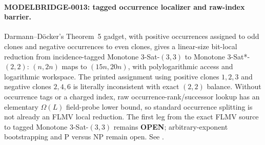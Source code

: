 \paragraph{MODELBRIDGE-0013: tagged occurrence localizer and raw-index barrier.}
Darmann--D\"ocker's Theorem~5 gadget, with positive occurrences assigned to
odd clones and negative occurrences to even clones, gives a linear-size
bit-local reduction from incidence-tagged Monotone 3-Sat-$(3,3)$ to
Monotone 3-Sat*-${}(2,2)$: $(n,2n)$ maps to $(15n,20n)$, with
polylogarithmic access and logarithmic workspace.  The printed assignment
using positive clones $1,2,3$ and negative clones $2,4,6$ is literally
inconsistent with exact $(2,2)$ balance.  Without occurrence tags or a
charged index, raw occurrence-rank/successor lookup has an elementary
$\Omega(L)$ field-probe lower bound, so standard occurrence splitting is not
already an FLMV local reduction.  The first leg from the exact FLMV source to
tagged Monotone 3-Sat-$(3,3)$ remains \textbf{OPEN}; arbitrary-exponent
bootstrapping and P versus NP remain open.  See
.
